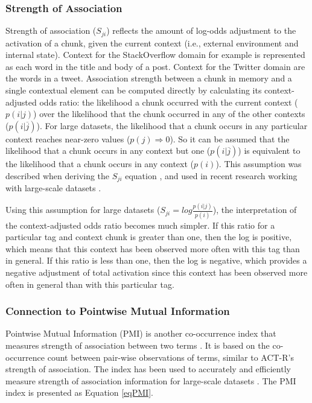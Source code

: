 \documentclass[man,floatsintext,donotrepeattitle]{apa6}
\begin{document}
\subsubsection{Strength of Association}

Strength of association ($S_{ji}$) reflects the amount of log-odds adjustment to the activation of a chunk, given the current context (i.e., external environment and internal state).
Context for the StackOverflow domain for example is represented as each word in the title and body of a post.
Context for the Twitter domain are the words in a tweet.
Association strength between a chunk in memory and a single contextual element can be computed directly by calculating its context-adjusted odds ratio:
the likelihood a chunk occurred with the current context ($p(i|j)$) over the likelihood that the chunk occurred in any of the other contexts ($p(i|\overline{j})$).
For large datasets, the likelihood that a chunk occurs in any particular context reaches near-zero values ($p(j) \Rightarrow 0$).
So it can be assumed that the likelihood that a chunk occurs in any context but one ($p(i|\overline{j})$) is equivalent to the likelihood that a chunk occurs in any context ($p(i)$).
This assumption was described when deriving the $S_{ji}$ equation \parencite{Anderson1989}, and used in recent research working with large-scale datasets \parencites{Stanley2013,Farahat2004,Douglass2010}.

Using this assumption for large datasets ($S_{ji} = log \frac{p(i|j)}{p(i)}$), the interpretation of the context-adjusted odds ratio becomes much simpler.
If this ratio for a particular tag and context chunk is greater than one, then the log is positive, which means that this context has been observed more often with this tag than in general.
If this ratio is less than one, then the log is negative, which provides a negative adjustment of total activation since this context has been observed more often in general than with this particular tag.

\subsubsection{Connection to Pointwise Mutual Information}

Pointwise Mutual Information (PMI) is another co-occurrence index that measures strength of association between two terms \parencite{Farahat2004}.
It is based on the co-occurrence count between pair-wise observations of terms, similar to ACT-R's strength of association.
The index has been used to accurately and efficiently measure strength of association information for large-scale datasets \parencite{Budiu2007,Farahat2004}.
The PMI index is presented as Equation \eqref{eqPMI}.
\end{document}
